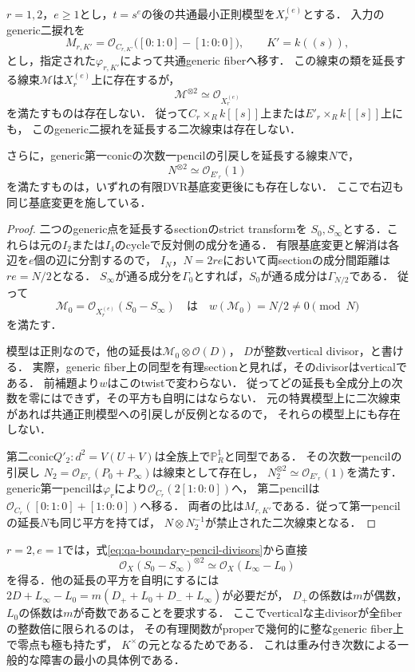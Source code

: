 \begin{theorem}[全有限分岐後にも残る入力二捩れの平方根障害]
\label{thm:qa-boundary-input-two-torsion-line-obstruction}
$r=1,2$，$e\ge1$とし，$t=s^e$の後の共通最小正則模型を$X_r^{(e)}$とする．
入力のgeneric二捩れを
\[
 M_{r,K'}=\mathcal O_{C_{r,K'}}\bigl([0:1:0]-[1:0:0]\bigr),
 \qquad K'=k((s)),
\]
とし，指定された$\varphi_{r,K'}$によって共通generic fiberへ移す．
この線束の類を延長する線束$\mathcal M$は$X_r^{(e)}$上に存在するが，
\[
                    \mathcal M^{\otimes2}\simeq\mathcal O_{X_r^{(e)}}
\]
を満たすものは存在しない．
従って$C_r\times_R k[[s]]$上または$E'_r\times_Rk[[s]]$上にも，
このgeneric二捩れを延長する二次線束は存在しない．

さらに，generic第一conicの次数一pencilの引戻しを延長する線束$N$で，
\[
                         N^{\otimes2}\simeq\mathcal O_{E'_r}(1)
\]
を満たすものは，いずれの有限DVR基底変更後にも存在しない．
ここで右辺も同じ基底変更を施している．
\end{theorem}
\begin{proof}
二つのgeneric点を延長するsectionのstrict transformを
$S_0,S_\infty$とする．これらは元の$I_2$または$I_4$のcycleで反対側の成分を通る．
有限基底変更と解消は各辺を$e$個の辺に分割するので，
$I_N$，$N=2re$において両sectionの成分間距離は$re=N/2$となる．
$S_\infty$が通る成分を$\Gamma_0$とすれば，$S_0$が通る成分は$\Gamma_{N/2}$である．
従って
\[
 \mathcal M_0=\mathcal O_{X_r^{(e)}}(S_0-S_\infty)
 \quad\text{は}\quad
 w(\mathcal M_0)=N/2\ne0\pmod N
\]
を満たす．

模型は正則なので，他の延長は$\mathcal M_0\otimes\mathcal O(D)$，
$D$が整数vertical divisor，と書ける．
実際，generic fiber上の同型を有理sectionと見れば，そのdivisorはverticalである．
前補題より$w$はこのtwistで変わらない．
従ってどの延長も全成分上の次数を零にはできず，その平方も自明にはならない．
元の特異模型上に二次線束があれば共通正則模型への引戻しが反例となるので，
それらの模型上にも存在しない．

第二conic$Q'_2:d^2=V(U+V)$は全族上で$\mathbb P^1_R$と同型である．
その次数一pencilの引戻し
$N_2=\mathcal O_{E'_r}(P_0+P_\infty)$は線束として存在し，
$N_2^{\otimes2}\simeq\mathcal O_{E'_r}(1)$を満たす．
generic第一pencilは$\varphi_r$により$\mathcal O_{C_r}(2[1:0:0])$へ，
第二pencilは$\mathcal O_{C_r}([0:1:0]+[1:0:0])$へ移る．
両者の比は$M_{r,K'}$である．従って第一pencilの延長$N$も同じ平方を持てば，
$N\otimes N_2^{-1}$が禁止された二次線束となる．
\end{proof}

\begin{remark}[一致型における平方の具体的な欠損]
$r=2,e=1$では，式\eqref{eq:qa-boundary-pencil-divisors}から直接
\[
 \mathcal O_X(S_0-S_\infty)^{\otimes2}
          \simeq\mathcal O_X(L_\infty-L_0)
\]
を得る．他の延長の平方を自明にするには
$2D+L_\infty-L_0=m(D_++L_0+D_-+L_\infty)$が必要だが，
$D_+$の係数は$m$が偶数，$L_0$の係数は$m$が奇数であることを要求する．
ここでverticalな主divisorが全fiberの整数倍に限られるのは，
その有理関数がproperで幾何的に整なgeneric fiber上で零点も極も持たず，
$K^\times$の元となるためである．
これは重み付き次数による一般的な障害の最小の具体例である．
\end{remark}

